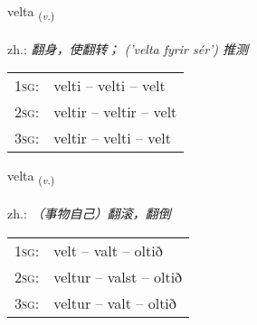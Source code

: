 \documentclass[frontgrid, backgrid]{flacards}\usepackage[]{graphicx}\usepackage[]{xcolor}
\begin{document}
\renewcommand{\flhead}{\vskip5pt \fboxsep=0pt {\small\bfseries\footnotesize Sagnorð | 动词}}
\renewcommand{\fcfoot}{\vskip5pt \fboxsep=0pt \hspace{2pt}{\small\bfseries\footnotesize 1K}}

\renewcommand{\blhead}{\vskip5pt {\small\bfseries\footnotesize Sagnorð | 动词 }}
\renewcommand{\bcfoot}{\vskip5pt \hspace{2pt}{\small\bfseries\footnotesize 1K}}


{velta \small{\textsubscript{(\textit{v.})}} \\[1ex] %
\textphonetic{[vɛl̥ta]} \\
zh.: \emph{翻身，使翻转； ('velta fyrir sér') 推测} \\  [2ex]
\renewcommand*{\arraystretch}{0.8}
\begin{tabular}{p{1cm}l}
\textsc{1sg}: & velti -- velti -- velt \\ 
\textsc{2sg}: & veltir -- veltir -- velt \\ 
\textsc{3sg}: & veltir -- velti -- velt \\ 
\end{tabular}
}

\renewcommand{\flhead}{\vskip5pt \fboxsep=0pt {\small\bfseries\footnotesize Sagnorð | 动词}}
\renewcommand{\fcfoot}{\vskip5pt \fboxsep=0pt \hspace{2pt}{\small\bfseries\footnotesize 1K}}

\renewcommand{\blhead}{\vskip5pt {\small\bfseries\footnotesize Sagnorð | 动词 }}
\renewcommand{\bcfoot}{\vskip5pt \hspace{2pt}{\small\bfseries\footnotesize 1K}}


{velta \small{\textsubscript{(\textit{v.})}} \\[1ex] %
\textphonetic{[vɛl̥ta]} \\
zh.: \emph{（事物自己）翻滚，翻倒} \\  [2ex]
\renewcommand*{\arraystretch}{0.8}
\begin{tabular}{p{1cm}l}
\textsc{1sg}: & velt -- valt -- oltið \\ 
\textsc{2sg}: & veltur -- valst -- oltið \\ 
\textsc{3sg}: & veltur -- valt -- oltið \\ 
\end{tabular}
}
\end{document}
